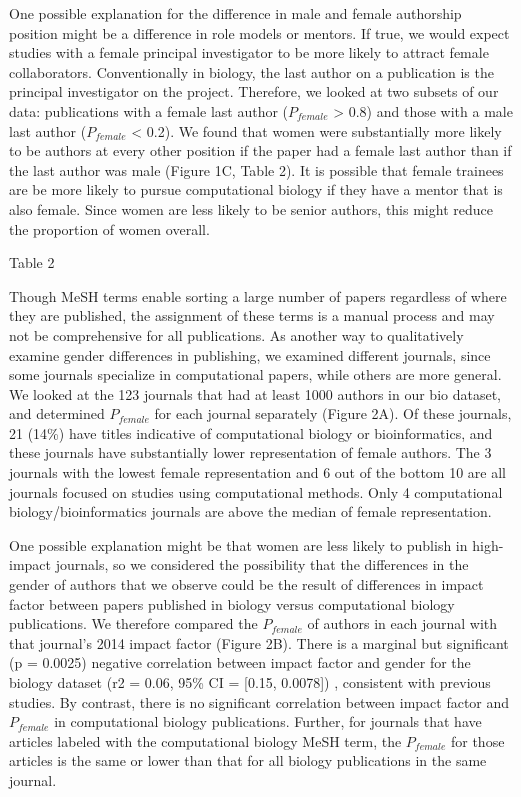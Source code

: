 \documentclass[11pt]{article}
\begin{document}
One possible explanation for the difference in male and female authorship position might be a difference in role models or mentors. If true, we would expect studies with a female principal investigator to be more likely to attract female collaborators. Conventionally in biology,  the last author on a publication is the principal investigator on the project. Therefore, we looked at two subsets of our data: publications with a female last author ($P_{female}$ > 0.8) and those with a male last author ($P_{female}$ < 0.2). We found that women were substantially more likely to be authors at every other position if the paper had a female last author than if the last author was male (Figure 1C, Table 2). It is possible that female trainees are be more likely to pursue computational biology if they have a mentor that is also female. Since women are less likely to be senior authors, this might reduce the proportion of women overall.


Table 2

Though MeSH terms enable sorting a large number of papers regardless of where they are published, the assignment of these terms is a manual process and may not be comprehensive for all publications. As another way to qualitatively examine gender differences in publishing, we examined different journals, since some journals specialize in computational papers, while others are more general. We looked at the 123  journals that had at least 1000 authors in our bio dataset, and determined $P_{female}$ for each journal separately (Figure 2A). Of these journals, 21 (14\%) have titles indicative of computational biology or bioinformatics, and these journals have substantially lower representation of female authors. The 3 journals with the lowest female representation and 6 out of the bottom 10 are all journals focused on studies using computational methods. Only 4 computational biology/bioinformatics journals are above the median of female representation.

One possible explanation might be that women are less likely to publish in high-impact journals, so we considered the possibility that the differences in the gender of authors that we observe could be the result of differences in impact factor between papers published in biology versus computational biology publications. We therefore compared the $P_{female}$ of authors in each journal with that journal’s 2014 impact factor (Figure 2B). There is a marginal but significant (p = 0.0025) negative correlation between impact factor and gender for the biology dataset (r2 = 0.06, 95\% CI = [0.15, 0.0078]) , consistent with previous studies. By contrast, there is no significant correlation between impact factor and $P_{female}$ in computational biology publications. Further, for journals that have articles labeled with the computational biology MeSH term, the $P_{female}$ for those articles is the same or lower than that for all biology publications in the same journal.
\end{document}
